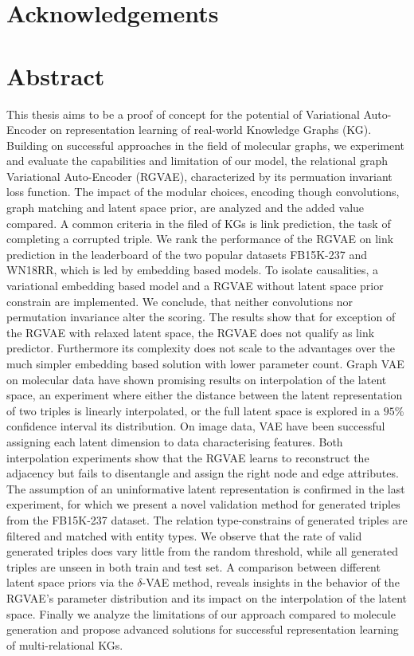 \documentclass{article}
\begin{document}
\newpage
{}

\section*{Acknowledgements}
\newpage
\section*{Abstract}

This thesis aims to be a proof of concept for the potential of Variational Auto-Encoder on representation learning of real-world Knowledge Graphs (KG). Building on successful approaches in the field of molecular graphs, we experiment and evaluate the capabilities and limitation of our model, the relational graph Variational Auto-Encoder (RGVAE), characterized by its permuation invariant loss function. The impact of the modular choices, encoding though convolutions, graph matching and latent space prior, are analyzed and the added value compared. A common criteria in the filed of KGs is link prediction, the task of completing a corrupted triple. We rank the performance of the RGVAE on link prediction in the leaderboard of the two popular datasets FB15K-237 and WN18RR, which is led by embedding based models. To isolate causalities, a variational embedding based model and a RGVAE without latent space prior constrain are implemented. We conclude, that neither convolutions nor permutation invariance alter the scoring. The results show that for exception of the RGVAE with relaxed latent space, the RGVAE does not qualify as link predictor. Furthermore its complexity does not scale to the advantages over the much simpler embedding based solution with lower parameter count.
Graph VAE on molecular data have shown promising results on interpolation of the latent space, an experiment where either the distance between the latent representation of two triples is linearly interpolated, or the full latent space is explored in a $95$\% confidence interval its distribution. On image data, VAE have been successful assigning each latent dimension to data characterising features. Both interpolation experiments show that the RGVAE learns to reconstruct the adjacency but fails to disentangle and assign the right node and edge attributes. The assumption of an uninformative latent representation is confirmed in the last experiment, for which we present a novel validation method for generated triples from the FB15K-237 dataset. The relation type-constrains of generated triples are filtered and matched with entity types. We observe that the rate of valid generated triples does vary little from the random threshold, while all generated triples are unseen in both train and test set. A comparison between different latent space priors via the $\delta$-VAE method, reveals insights in the behavior of the RGVAE's parameter distribution and its impact on the interpolation of the latent space. Finally we analyze the limitations of our approach compared to molecule generation and propose advanced solutions for successful representation learning of multi-relational KGs. 
\end{document}
